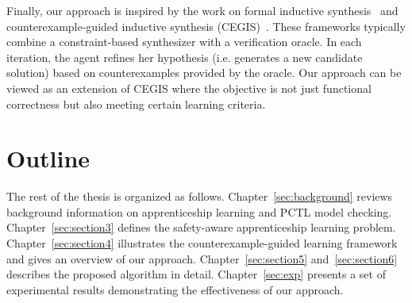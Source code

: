 Finally, our approach is inspired by the work on formal inductive synthesis~\cite{jha-ai2017} and counterexample-guided inductive synthesis (CEGIS)~\cite{CEGIS}. These frameworks typically combine a constraint-based synthesizer with a verification oracle. In each iteration, the agent refines her hypothesis (i.e. generates a new candidate solution) based on counterexamples provided by the oracle. Our approach can be viewed as an extension of CEGIS where the objective is not just functional correctness but also meeting certain learning criteria. 

\section{Outline}
The rest of the thesis is organized as follows. 
Chapter~\ref{sec:background} reviews background information on apprenticeship learning and PCTL model checking. 
Chapter~\ref{sec:section3} defines the safety-aware apprenticeship learning problem. 
Chapter~\ref{sec:section4} illustrates the counterexample-guided learning framework and gives an overview of our approach. 
Chapter~\ref{sec:section5} and~\ref{sec:section6} describes the proposed algorithm in detail. 
Chapter~\ref{sec:exp} presents a set of experimental results demonstrating the effectiveness of our approach. 

